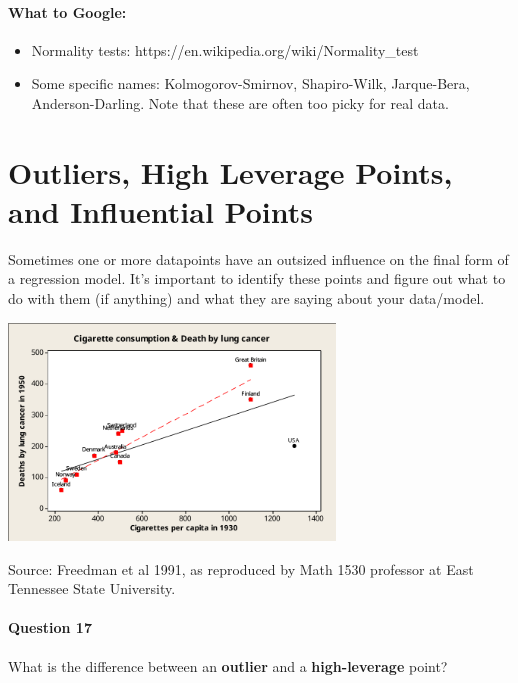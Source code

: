 \paragraph{What to Google:}
\begin{itemize}
\item Normality tests: {\color{blue} https://en.wikipedia.org/wiki/Normality\_test}
\item Some specific names: Kolmogorov-Smirnov, Shapiro-Wilk, Jarque-Bera, Anderson-Darling. Note that these are often too picky for real data.
\end{itemize}

\newpage



\section{Outliers, High Leverage Points, and Influential Points}

Sometimes one or more datapoints have an outsized influence on the final form of a regression model. It's important to identify these points and figure out what to do with them (if anything) and what they are saying about your data/model. 

\begin{center}
\includegraphics[width=0.65\textwidth]{img/cigarettes-lung-cancer.pdf}
\end{center}
{\small Source: Freedman et al 1991, as reproduced by Math 1530 professor at East Tennessee State University.}

\paragraph{Question 17} What is the difference between an \textbf{outlier} and a \textbf{high-leverage} point?

\vspace{30mm}

